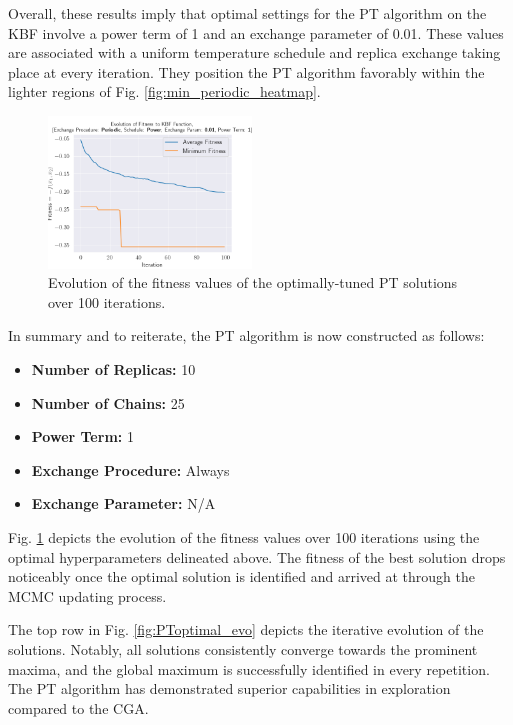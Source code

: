 \documentclass[10pt]{article}
\begin{document}
\begin{multicols}{2}
Overall, these results imply that optimal settings for the PT algorithm on the KBF involve a power term of 1 and an exchange parameter of 0.01. These values are associated with a uniform temperature schedule and replica exchange taking place at every iteration. They position the PT algorithm favorably within the lighter regions of Fig. \ref{fig:min_periodic_heatmap}.

\begin{figure}[H]
    \centering
    \includegraphics[width=0.48\textwidth]{../figures/Permanent Images/0.01_1_Periodic_Fitness.png}
    \captionsetup{justification=centering}
    \caption{Evolution of the fitness values of the optimally-tuned PT solutions over 100 iterations.}
    \label{fig:PToptimal_fitness}
\end{figure}

In summary and to reiterate, the PT algorithm is now constructed as follows:

\begin{itemize}
    \item \textbf{Number of Replicas:} 10
    \item \textbf{Number of Chains:} 25
    \item \textbf{Power Term:} 1
    \item \textbf{Exchange Procedure:} Always
    \item \textbf{Exchange Parameter:} N/A
\end{itemize}

Fig. \ref{fig:PToptimal_fitness} depicts the evolution of the fitness values over 100 iterations using the optimal hyperparameters delineated above. The fitness of the best solution drops noticeably once the optimal solution is identified and arrived at through the MCMC updating process.

The top row in Fig. \ref{fig:PToptimal_evo} depicts the iterative evolution of the solutions. Notably, all solutions consistently converge towards the prominent maxima, and the global maximum is successfully identified in every repetition. The PT algorithm has demonstrated superior capabilities in exploration compared to the CGA.


\end{multicols}
\end{document}
